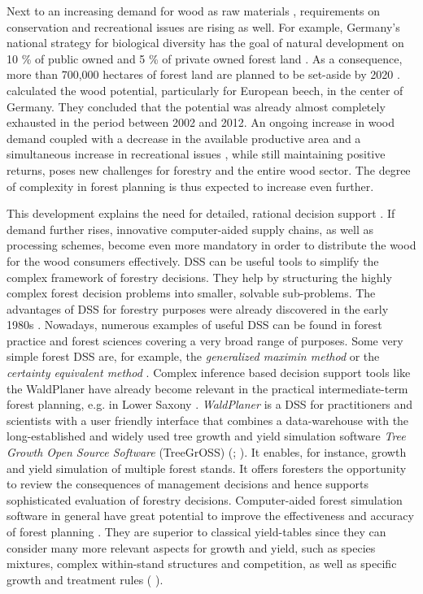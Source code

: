 Next to an increasing demand for wood as raw materials \citep[p. 8]{mantau_2012}, requirements on conservation and recreational issues are rising as well. For example, Germany's national strategy for biological diversity has the goal of natural development on 10 \% of public owned and 5 \% of private owned forest land \citep[p. 45]{bmu_2007}. As a consequence, more than 700,000 hectares of forest land are planned to be set-aside by 2020 \citep{ti_2014}. \citet[p. 3]{auer_2016} calculated the wood potential, particularly for European beech, in the center of Germany. They concluded that the potential was already almost completely exhausted in the period between 2002 and 2012. An ongoing increase in wood demand coupled with a decrease in the available productive area and a simultaneous increase in recreational issues \citep[p. 1]{hansen_2012}, while still maintaining positive returns, poses new challenges for forestry and the entire wood sector. The degree of complexity in forest planning is thus expected to increase even further.

This development explains the need for detailed, rational decision support \citep[p. 2]{hansen_2014}. If demand further rises, innovative computer-aided supply chains, as well as processing schemes, become even more mandatory in order to distribute the wood for the wood consumers effectively. DSS can be useful tools to simplify the complex framework of forestry decisions. They help by structuring the highly complex forest decision problems into smaller, solvable sub-problems. The advantages of DSS for forestry purposes were already discovered in the early 1980s \citep[p. 499]{reynolds_2008}. Nowadays, numerous examples of useful DSS can be found in forest practice and forest sciences covering a very broad range of purposes. Some very simple forest DSS are, for example, the \textit{generalized maximin method} or the \textit{certainty equivalent method} \citep[p. 25, 28]{kangas_2015}. Complex inference based decision support tools like the WaldPlaner \citep{hansen_2014} have already become relevant in the practical intermediate-term forest planning, e.g. in Lower Saxony \citep[p. 158]{bockmann_2004}. \textit{WaldPlaner} is a DSS for practitioners and scientists with a user friendly interface that combines a data-warehouse with the long-established and widely used tree growth and yield simulation software \textit{Tree Growth Open Source Software} (TreeGrOSS) (\citealp[p. 46]{hansen_2014}; \citealp{nagel_2009}). It enables, for instance, growth and yield simulation of multiple forest stands. It offers foresters the opportunity to review the consequences of management decisions and hence supports sophisticated evaluation of forestry decisions. Computer-aided forest simulation software in general have great potential to improve the effectiveness and accuracy of forest planning \citep[p. 210]{davis_2001}. They are superior to classical yield-tables since they can consider many more relevant aspects for growth and yield, such as species mixtures, complex within-stand structures and competition, as well as specific growth and treatment  rules (\citealp[p. 3]{hansen_2012} \citealp[p. 93]{muys_2010}).

